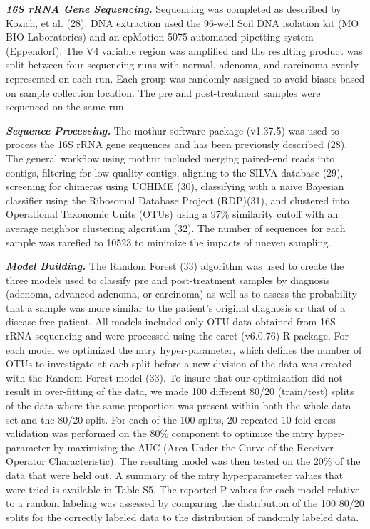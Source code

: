 \documentclass[12pt,]{article}
\begin{document}
\textbf{\emph{16S rRNA Gene Sequencing.}} Sequencing was completed as
described by Kozich, et al. (28). DNA extraction used the 96-well Soil
DNA isolation kit (MO BIO Laboratories) and an epMotion 5075 automated
pipetting system (Eppendorf). The V4 variable region was amplified and
the resulting product was split between four sequencing runs with
normal, adenoma, and carcinoma evenly represented on each run. Each
group was randomly assigned to avoid biases based on sample collection
location. The pre and post-treatment samples were sequenced on the same
run.

\textbf{\emph{Sequence Processing.}} The mothur software package
(v1.37.5) was used to process the 16S rRNA gene sequences and has been
previously described (28). The general workflow using mothur included
merging paired-end reads into contigs, filtering for low quality
contigs, aligning to the SILVA database (29), screening for chimeras
using UCHIME (30), classifying with a naive Bayesian classifier using
the Ribosomal Database Project (RDP)(31), and clustered into Operational
Taxonomic Units (OTUs) using a 97\% similarity cutoff with an average
neighbor clustering algorithm (32). The number of sequences for each
sample was rarefied to 10523 to minimize the impacts of uneven sampling.

\textbf{\emph{Model Building.}} The Random Forest (33) algorithm was
used to create the three models used to classify pre and post-treatment
samples by diagnosis (adenoma, advanced adenoma, or carcinoma) as well
as to assess the probability that a sample was more similar to the
patient's original diagnosis or that of a disease-free patient. All
models included only OTU data obtained from 16S rRNA sequencing and were
processed using the caret (v6.0.76) R package. For each model we
optimized the mtry hyper-parameter, which defines the number of OTUs to
investigate at each split before a new division of the data was created
with the Random Forest model (33). To insure that our optimization did
not result in over-fitting of the data, we made 100 different 80/20
(train/test) splits of the data where the same proportion was present
within both the whole data set and the 80/20 split. For each of the 100
splits, 20 repeated 10-fold cross validation was performed on the 80\%
component to optimize the mtry hyper-parameter by maximizing the AUC
(Area Under the Curve of the Receiver Operator Characteristic). The
resulting model was then tested on the 20\% of the data that were held
out. A summary of the mtry hyperparameter values that were tried is
available in Table S5. The reported P-values for each model relative to
a random labeling was assessed by comparing the distribution of the 100
80/20 splits for the correctly labeled data to the distribution of
randomly labeled data.
\end{document}

